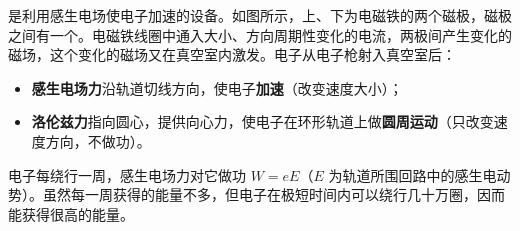 是利用感生电场使电子加速的设备。如图所示，上、下为电磁铁的两个磁极，磁极之间有一个。电磁铁线圈中通入大小、方向周期性变化的电流，两极间产生变化的磁场，这个变化的磁场又在真空室内激发。电子从电子枪射入真空室后：
\begin{itemize}[leftmargin=2.4em,label=\textbullet]
  \item \textbf{感生电场力}沿轨道切线方向，使电子\textbf{加速}（改变速度大小）；
  \item \textbf{洛伦兹力}指向圆心，提供向心力，使电子在环形轨道上做\textbf{圆周运动}（只改变速度方向，不做功）。
\end{itemize}
电子每绕行一周，感生电场力对它做功 $W=eE$（$E$ 为轨道所围回路中的感生电动势）。虽然每一周获得的能量不多，但电子在极短时间内可以绕行几十万圈，因而能获得很高的能量。

